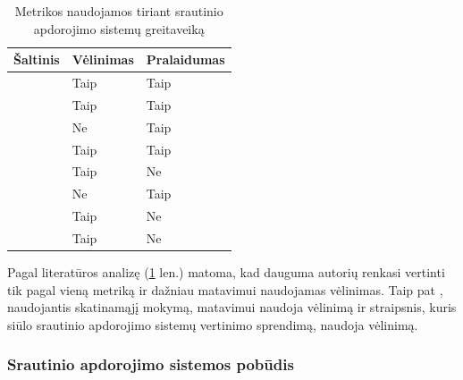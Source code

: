 \documentclass{VUMIFPSbakalaurinis}
\begin{document}
\begin{table}[H]
    \centering
    \caption{Metrikos naudojamos tiriant srautinio apdorojimo sistemų greitaveiką}
    \begin{tabular}{|l|l|l|}
    \hline
    Šaltinis                 & Vėlinimas                        & Pralaidumas                    \\ \hline
    \cite{stonebraker20058}  & Taip                             & Taip                           \\ \hline
    \cite{Karimov2018BenchmarkingDS} & Taip                     & Taip                           \\ \hline
    \cite{hirzel2014catalog} & Ne                               & Taip                           \\ \hline
    \cite{Qian2016Benchmarking} & Taip                          & Taip                           \\ \hline
    \cite{zhang2020heron}    & Taip                             & Ne                             \\ \hline
    \cite{dhalion}           & Ne                               & Taip                           \\ \hline
    \cite{vaquero2018autotuning} & Taip                         & Ne                             \\ \hline
    \cite{Chintapalli2016Benchmarking} & Taip                   & Ne                             \\ \hline
    \end{tabular}
\label{metrikos}
\end{table}

Pagal literatūros analizę (\ref{metrikos} len.) matoma, kad dauguma autorių renkasi vertinti tik pagal vieną metriką ir dažniau matavimui naudojamas vėlinimas. Taip pat \cite{vaquero2018autotuning}, naudojantis skatinamąjį mokymą, matavimui naudoja vėlinimą ir \cite{Chintapalli2016Benchmarking} straipsnis, kuris siūlo srautinio apdorojimo sistemų vertinimo sprendimą, naudoja vėlinimą. 

\subsubsection{Srautinio apdorojimo sistemos pobūdis}
\end{document}
